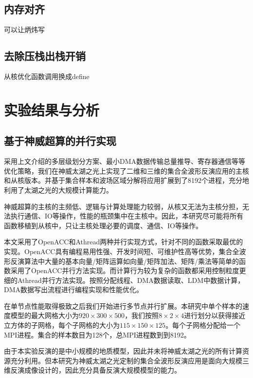 \documentclass[degree=doctor]{thuthesis}
\begin{document}
\subsection{内存对齐}
可以让炳炜写


\subsection{去除压栈出栈开销}
从核优化函数调用换成define




\section{实验结果与分析} %
\label{sec:实验结果与分析}

\subsection{基于神威超算的并行实现}

采用上文介绍的多层级划分方案、最小DMA数据传输总量推导、寄存器通信等等优化策略，我们在神威太湖之光上实现了二维和三维的集合全波形反演应用的主核和从核版本。并基于集合样本和波场区域分解将应用扩展到了8192个进程，充分地利用了太湖之光的大规模计算能力。

神威超算的主核的主频低、逻辑与计算处理能力较弱，从核又无法为主核分担，无法执行通信、IO等操作，性能的瓶颈集中在主核中。因此，本研究尽可能将所有函数移植到从核中，只让主核处理必要的调度、通信、IO等操作。

本文采用了OpenACC和Athread两种并行实现方式，针对不同的函数采取最优的实现。OpenACC具有编程易用性强、开发时间短、可维护性高等优势，集合全波形反演算法中大量的基本向量/矩阵运算如向量/矩阵加法、矩阵/乘法等简单的函数采用了OpenACC并行方法实现。而计算行为较为复杂的函数都采用控制粒度更细的Athread并行方法实现。按照分配线程、DMA数据读取、LDM中数据计算，DMA数据写出流程进行编程实现和性能优化。

在单节点性能取得极致之后我们开始进行多节点并行扩展。本研究中单个样本的速度模型的最大网格大小为$920\times 300 \times 500$，我们按照$8\times 2 \times 4$进行划分以获得接近立方体的子网格，每个子网格的大小为$115\times150\times125$。每个子网格分配给一个MPI进程。集合的样本数目为128个，总MPI进程数到到8192。

由于本实验反演的是中小规模的地质模型，因此并未将神威太湖之光的所有计算资源充分利用。但本研究为神威太湖之光定制的集合全波形反演应用是面向大规模三维反演成像设计的，因此充分具备反演大规模模型的能力。
\end{document}
